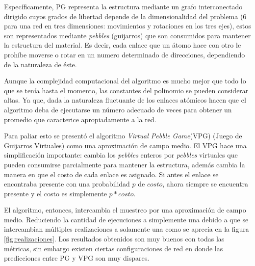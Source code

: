 Específicamente, PG representa la estructura mediante un grafo interconectado dirigido cuyos grados de libertad depende de la dimensionalidad del problema (6 para una red en tres dimensiones: movimientos y rotaciones en los tres ejes), estos son representados mediante \emph{pebbles} (guijarros) que son consumidos para mantener la estructura del material. Es decir, cada enlace que un átomo hace con otro le prohíbe moverse o rotar en un numero determinado de direcciones, dependiendo de la naturaleza de éste.

Aunque la complejidad computacional del algoritmo es mucho mejor que todo lo que se tenía hasta el momento, las constantes del polinomio se pueden considerar altas. Ya que, dada la naturaleza fluctuante de los enlaces atómicos hacen que el algoritmo deba de ejecutarse un número adecuado de veces para obtener un promedio que caracterice apropiadamente a la red.

Para paliar esto se presentó el algoritmo \emph{Virtual Pebble Game}(VPG)\parencite{Gonzalez2011} (Juego de Guijarros Virtuales) como una aproximación de campo medio. El VPG hace una simplificación importante: cambia los \emph{pebbles} enteros por \emph{pebbles} virtuales que pueden consumirse parcialmente para mantener la estructura, además cambia la manera en que el costo de cada enlace es asignado. Si antes el enlace se encontraba presente con una probabilidad $p$ de $costo$, ahora siempre se encuentra presente y el costo es simplemente $p*costo$.

El algoritmo, entonces, intercambia el muestreo por una aproximación de campo medio. Reduciendo la cantidad de ejecuciones a simplemente una debido a que se intercambian múltiples realizaciones a solamente una como se aprecia en la figura \ref{fig:realizaciones}. Los resultados obtenidos son muy buenos con todas las métricas, sin embargo existen ciertas configuraciones de red en donde las predicciones entre PG y VPG son muy dispares.


